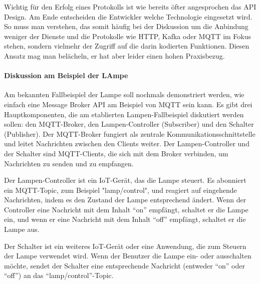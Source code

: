 \documentclass[../vs-script-first-v01.tex]{subfiles}
\begin{document}
Wichtig für den Erfolg eines Protokolls ist wie bereits öfter angesprochen das API Design. Am Ende entscheiden die Entwickler welche Technologie eingesetzt wird. So muss man verstehen, das somit häufig bei der Diskussion um die Anbindung weniger der Dienste und  die Protokolle wie HTTP, Kafka oder MQTT im Fokus stehen, sondern vielmehr der Zugriff auf die darin kodierten Funktionen. Diesen Ansatz mag man belächeln, er hat aber leider einen hohen Praxisbezug.  
\paragraph{Diskussion am Beispiel der LAmpe}
Am bekannten Fallbeispiel der Lampe soll nochmals demonstriert werden, wie einfach eine Message Broker API am Beispiel von MQTT sein kann. Es gibt drei Hauptkomponenten, die am etablierten Lampen-Fallbeispiel diskutiert werden sollen: den MQTT-Broker, den Lampen-Controller (Subscriber) und den Schalter (Publisher). Der MQTT-Broker fungiert als zentrale Kommunikationsschnittstelle und leitet Nachrichten zwischen den Clients weiter. Der Lampen-Controller und der Schalter sind MQTT-Clients, die sich mit dem Broker verbinden, um Nachrichten zu senden und zu empfangen.

Der Lampen-Controller ist ein IoT-Gerät, das die Lampe steuert. Es abonniert ein MQTT-Topic, zum Beispiel "lamp/control", und reagiert auf eingehende Nachrichten, indem es den Zustand der Lampe entsprechend ändert. Wenn der Controller eine Nachricht mit dem Inhalt \enquote{on} empfängt, schaltet er die Lampe ein, und wenn er eine Nachricht mit dem Inhalt \enquote{off} empfängt, schaltet er die Lampe aus.

Der Schalter ist ein weiteres IoT-Gerät oder eine Anwendung, die zum Steuern der Lampe verwendet wird. Wenn der Benutzer die Lampe ein- oder ausschalten möchte, sendet der Schalter eine entsprechende Nachricht (entweder \enquote{on} oder \enquote{off}) an das \enquote{lamp/control}-Topic.
\end{document}
